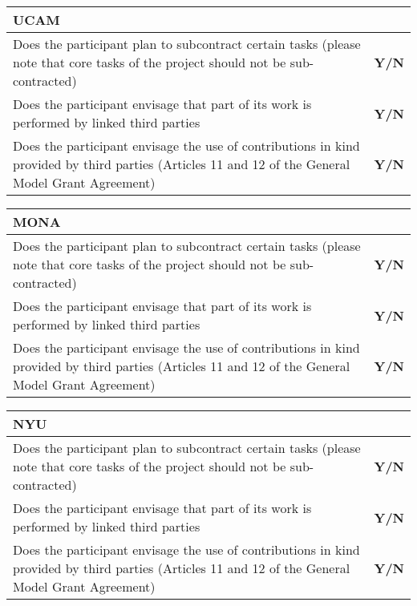 \begin{tabular}{|p{}|p{}|}
  \hline  
  \multicolumn{2}{|l|}{\cellcolor[gray]{0.8}\textbf{UCAM}}\\
  \hline
  Does the participant plan to subcontract certain tasks (please note that core tasks of the project should not be sub-contracted) &
  \textbf{Y/N} \\
  \hline
Does the participant envisage that part of its work is performed by linked
third parties &
  \textbf{Y/N} \\
  \hline
  Does the participant envisage the use of contributions in kind provided by
third parties (Articles 11 and 12 of the General Model Grant Agreement) &
  \textbf{Y/N}\\
  \hline
\end{tabular}

\begin{tabular}{|p{}|p{}|}
  \hline  
  \multicolumn{2}{|l|}{\cellcolor[gray]{0.8}\textbf{MONA}}\\
  \hline
  Does the participant plan to subcontract certain tasks (please note that core tasks of the project should not be sub-contracted) &
  \textbf{Y/N} \\
  \hline
Does the participant envisage that part of its work is performed by linked
third parties &
  \textbf{Y/N} \\
  \hline
  Does the participant envisage the use of contributions in kind provided by
third parties (Articles 11 and 12 of the General Model Grant Agreement) &
  \textbf{Y/N}\\
  \hline
\end{tabular}

\begin{tabular}{|p{}|p{}|}
  \hline  
  \multicolumn{2}{|l|}{\cellcolor[gray]{0.8}\textbf{NYU}}\\
  \hline
  Does the participant plan to subcontract certain tasks (please note that core tasks of the project should not be sub-contracted) &
  \textbf{Y/N} \\
  \hline
Does the participant envisage that part of its work is performed by linked
third parties &
  \textbf{Y/N} \\
  \hline
  Does the participant envisage the use of contributions in kind provided by
third parties (Articles 11 and 12 of the General Model Grant Agreement) &
  \textbf{Y/N}\\
  \hline
\end{tabular}

